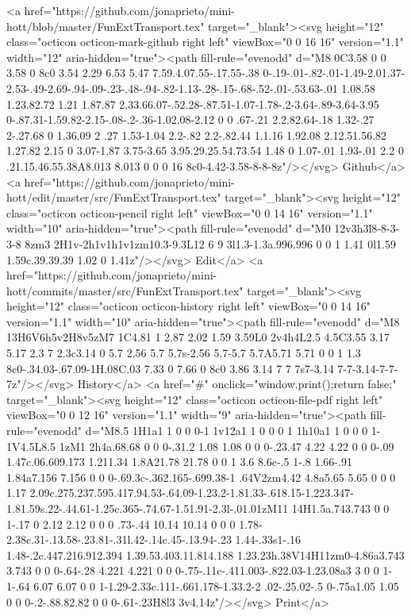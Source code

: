       <a href="https://github.com/jonaprieto/mini-hott/blob/master/FunExtTransport.tex" target="_blank"><svg height="12" class="octicon octicon-mark-github right left" viewBox="0 0 16 16" version="1.1" width="12" aria-hidden="true"><path fill-rule="evenodd" d="M8 0C3.58 0 0 3.58 0 8c0 3.54 2.29 6.53 5.47 7.59.4.07.55-.17.55-.38 0-.19-.01-.82-.01-1.49-2.01.37-2.53-.49-2.69-.94-.09-.23-.48-.94-.82-1.13-.28-.15-.68-.52-.01-.53.63-.01 1.08.58 1.23.82.72 1.21 1.87.87 2.33.66.07-.52.28-.87.51-1.07-1.78-.2-3.64-.89-3.64-3.95 0-.87.31-1.59.82-2.15-.08-.2-.36-1.02.08-2.12 0 0 .67-.21 2.2.82.64-.18 1.32-.27 2-.27.68 0 1.36.09 2 .27 1.53-1.04 2.2-.82 2.2-.82.44 1.1.16 1.92.08 2.12.51.56.82 1.27.82 2.15 0 3.07-1.87 3.75-3.65 3.95.29.25.54.73.54 1.48 0 1.07-.01 1.93-.01 2.2 0 .21.15.46.55.38A8.013 8.013 0 0 0 16 8c0-4.42-3.58-8-8-8z"/></svg> Github</a>
      <a href="https://github.com/jonaprieto/mini-hott/edit/master/src/FunExtTransport.tex" target="_blank"><svg height="12" class="octicon octicon-pencil right left" viewBox="0 0 14 16" version="1.1" width="10" aria-hidden="true"><path fill-rule="evenodd" d="M0 12v3h3l8-8-3-3-8 8zm3 2H1v-2h1v1h1v1zm10.3-9.3L12 6 9 3l1.3-1.3a.996.996 0 0 1 1.41 0l1.59 1.59c.39.39.39 1.02 0 1.41z"/></svg> Edit</a>
      <a href="https://github.com/jonaprieto/mini-hott/commits/master/src/FunExtTransport.tex" target="_blank"><svg height="12" class="octicon octicon-history right left" viewBox="0 0 14 16" version="1.1" width="10" aria-hidden="true"><path fill-rule="evenodd" d="M8 13H6V6h5v2H8v5zM7 1C4.81 1 2.87 2.02 1.59 3.59L0 2v4h4L2.5 4.5C3.55 3.17 5.17 2.3 7 2.3c3.14 0 5.7 2.56 5.7 5.7s-2.56 5.7-5.7 5.7A5.71 5.71 0 0 1 1.3 8c0-.34.03-.67.09-1H.08C.03 7.33 0 7.66 0 8c0 3.86 3.14 7 7 7s7-3.14 7-7-3.14-7-7-7z"/></svg> History</a>
      <a  href="#" onclick="window.print();return false;" target="_blank"><svg height="12" class="octicon octicon-file-pdf right left" viewBox="0 0 12 16" version="1.1" width="9" aria-hidden="true"><path fill-rule="evenodd" d="M8.5 1H1a1 1 0 0 0-1 1v12a1 1 0 0 0 1 1h10a1 1 0 0 0 1-1V4.5L8.5 1zM1 2h4a.68.68 0 0 0-.31.2 1.08 1.08 0 0 0-.23.47 4.22 4.22 0 0 0-.09 1.47c.06.609.173 1.211.34 1.8A21.78 21.78 0 0 1 3.6 8.6c-.5 1-.8 1.66-.91 1.84a7.156 7.156 0 0 0-.69.3c-.362.165-.699.38-1 .64V2zm4.42 4.8a5.65 5.65 0 0 0 1.17 2.09c.275.237.595.417.94.53-.64.09-1.23.2-1.81.33-.618.15-1.223.347-1.81.59s.22-.44.61-1.25c.365-.74.67-1.51.91-2.3l-.01.01zM11 14H1.5a.743.743 0 0 1-.17 0 2.12 2.12 0 0 0 .73-.44 10.14 10.14 0 0 0 1.78-2.38c.31-.13.58-.23.81-.31l.42-.14c.45-.13.94-.23 1.44-.33s1-.16 1.48-.2c.447.216.912.394 1.39.53.403.11.814.188 1.23.23h.38V14H11zm0-4.86a3.743 3.743 0 0 0-.64-.28 4.221 4.221 0 0 0-.75-.11c-.411.003-.822.03-1.23.08a3 3 0 0 1-1-.64 6.07 6.07 0 0 1-1.29-2.33c.111-.661.178-1.33.2-2 .02-.25.02-.5 0-.75a1.05 1.05 0 0 0-.2-.88.82.82 0 0 0-.61-.23H8l3 3v4.14z"/></svg> Print</a>
